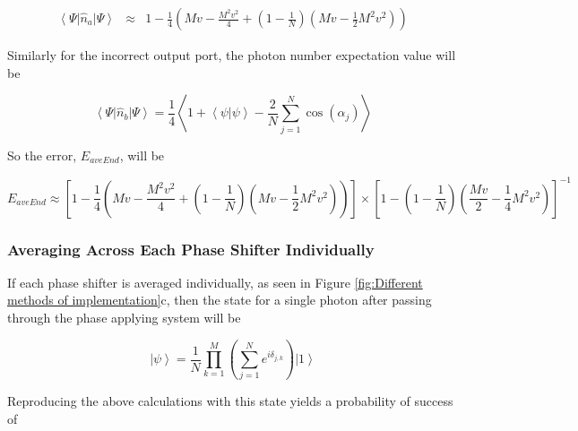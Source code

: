 \documentclass[aps,pra,twocolumn,superscriptaddress,numerical]{revtex4-1}
\begin{document}
			\begin{widetext}
				\begin{eqnarray}
					\left\langle \Psi\right|\hat{n}_{a}\left|\Psi\right\rangle  
					& \approx & 1-\frac{1}{4}\left(Mv-\frac{M^{2}v^{2}}{4}+\left(1-\frac{1}{N}\right)\left(Mv-\frac{1}{2}M^{2}v^{2}\right)\right)
				\end{eqnarray}
			\end{widetext}	
			
			Similarly for the incorrect output port, the photon number expectation value will be
			
			\begin{equation}
				\left\langle \Psi\right|\hat{n}_{b}\left|\Psi\right\rangle = \frac{1}{4}\left\langle 1+\left\langle \psi|\psi\right\rangle -\frac{2}{N}\sum_{j=1}^{N}\cos\left(\alpha_{j}\right)\right\rangle 
			\end{equation}
			
			
			So the error, $E_{aveEnd}$, will be
			
			\begin{widetext}
				\begin{equation}
					E_{aveEnd}  \approx  \left[1-\frac{1}{4}\left(Mv-\frac{M^{2}v^{2}}{4}+\left(1-\frac{1}{N}\right)\left(Mv-\frac{1}{2}M^{2}v^{2}\right)\right)\right]\nonumber\times\left[1-\left(1-\frac{1}{N}\right)\left(\frac{Mv}{2}-\frac{1}{4}M^{2}v^{2}\right)\right]^{-1}\label{eq:ErrorAvEnd}
				\end{equation}
			\end{widetext}
			
			
		\subsubsection{Averaging Across Each Phase Shifter Individually\label{Averaging Across Each Phase Shifter Individually}}
			
			If each phase shifter is averaged individually, as seen in Figure \ref{fig:Different methods of implementation}c, then the state for a single photon after passing through the phase applying system will be
			
			\begin{equation}
				\left|\psi\right\rangle =\frac{1}{N}\prod_{k=1}^{M}\left(\sum_{j=1}^{N}e^{i\delta_{j,k}}\right)\left|1\right\rangle \label{eq:AveStepPhaseState}
			\end{equation}
			
			
			Reproducing the above calculations with this state yields a probability of success of
			
\end{document}
